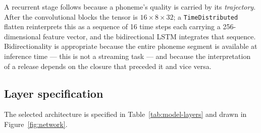 A recurrent stage follows because a phoneme's quality is carried by its
\emph{trajectory}. After the convolutional blocks the tensor is
$16 \times 8 \times 32$; a \texttt{TimeDistributed} flatten reinterprets this as
a sequence of 16 time steps each carrying a 256-dimensional feature vector, and
the bidirectional LSTM integrates that sequence. Bidirectionality is appropriate
because the entire phoneme segment is available at inference time --- this is
not a streaming task --- and because the interpretation of a release depends on
the closure that preceded it and vice versa.

\subsection{Layer specification}

The selected architecture is specified in Table~\ref{tab:model-layers} and drawn
in Figure~\ref{fig:network}.


